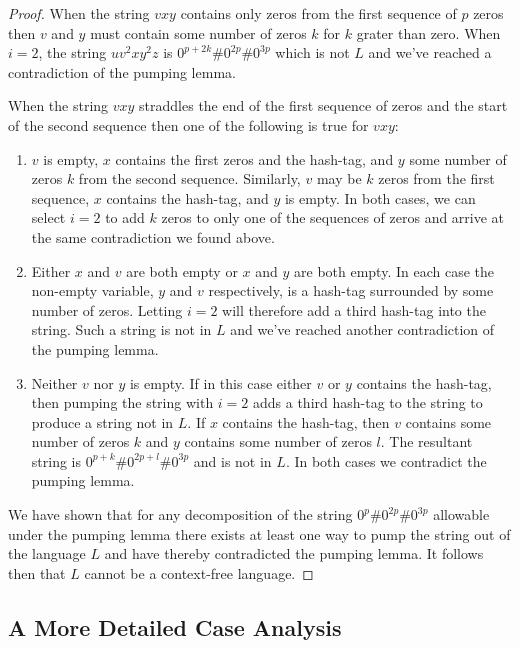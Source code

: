 \documentclass[10pt]{article}
\theoremstyle{definition}
\begin{document}
\begin{proof}
When the string $vxy$ contains only zeros from the first sequence of $p$ zeros then $v$ and $y$ must contain some number of zeros $k$ for $k$ grater than zero. When $i=2$, the string $uv^{2}xy^{2}z$ is $0^{p+2k}\# 0^{2p}\# 0^{3p}$ which is not $L$ and we've reached a contradiction of the pumping lemma.

When the string $vxy$ straddles the end of the first sequence of zeros and the start of the second sequence then one of the following is true for $vxy$:
\begin{enumerate}[ label=\textbf{\roman*.} ]
  \item $v$ is empty, $x$ contains the first zeros and the hash-tag, and $y$ some number of zeros $k$ from the second sequence. Similarly, $v$ may be $k$ zeros from the first sequence, $x$ contains the hash-tag, and $y$ is empty. In both cases, we can select $i=2$ to add $k$ zeros to only one of the sequences of zeros and arrive at the same contradiction we found above.
  \item Either $x$ and $v$ are both empty or $x$ and $y$ are both empty. In each case the non-empty variable, $y$ and $v$ respectively, is a hash-tag surrounded by some number of zeros. Letting $i=2$ will therefore add a third hash-tag into the string. Such a string is not in $L$ and we've reached another contradiction of the pumping lemma.
  \item Neither $v$ nor $y$ is empty. If in this case either $v$ or $y$ contains the hash-tag, then pumping the string with $i=2$ adds a third hash-tag to the string to produce a string not in $L$. If $x$ contains the hash-tag, then $v$ contains some number of zeros $k$ and $y$ contains some number of zeros $l$. The resultant string is $0^{p+k}\# 0^{2p+l} \# 0^{3p}$ and is not in $L$. In both cases we contradict the pumping lemma.
\end{enumerate}

We have shown that for any decomposition of the string $0^{p}\# 0^{2p} \# 0^{3p}$ allowable under the pumping lemma there exists at least one way to pump the string out of the language $L$ and have thereby contradicted the pumping lemma. It follows then that $L$ cannot be a context-free language.

\end{proof}

\subsection{A More Detailed Case Analysis}
\label{level2}
\end{document}
